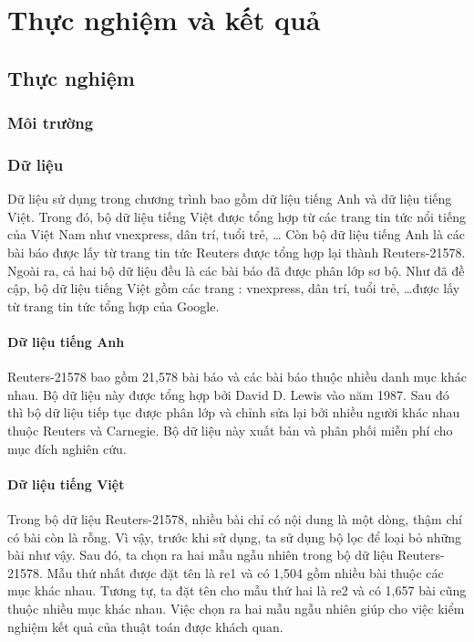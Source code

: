 \chapter{Thực nghiệm và kết quả}
\label{Chapter4}
\section{Thực nghiệm}
\subsection{Môi trường}


\subsection{Dữ liệu}
Dữ liệu sử dụng trong chương trình bao gồm dữ liệu tiếng Anh và dữ liệu tiếng Việt.
Trong đó, bộ dữ liệu tiếng Việt được tổng hợp từ các trang tin tức nổi tiếng của Việt Nam như vnexpress, dân trí, tuổi trẻ, \ldots
Còn bộ dữ liệu tiếng Anh là các bài báo được lấy từ trang tin tức Reuters được tổng hợp lại thành Reuters-21578.
Ngoài ra, cả hai bộ dữ liệu đều là các bài báo đã được phân lớp sơ bộ.
Như đã đề cập, bộ dữ liệu tiếng Việt gồm các trang : vnexpress, dân trí, tuổi trẻ, \ldots được lấy từ trang tin tức tổng hợp của Google.

\subsubsection{Dữ liệu tiếng Anh}
Reuters-21578 bao gồm 21,578 bài báo và các bài báo thuộc nhiều danh mục khác nhau.
Bộ dữ liệu này được tổng hợp bởi David D. Lewis vào năm 1987.
Sau đó thì bộ dữ liệu tiếp tục được phân lớp và chỉnh sửa lại bởi nhiều người khác nhau thuộc Reuters và Carnegie.
Bộ dữ liệu này xuất bản và phân phối miễn phí cho mục đích nghiên cứu.

\subsubsection{Dữ liệu tiếng Việt}
Trong bộ dữ liệu Reuters-21578, nhiều bài chỉ có nội dung là một dòng, thậm chí có bài còn là rỗng.
Vì vậy, trước khi sử dụng, ta sử dụng bộ lọc để loại bỏ những bài như vậy.
Sau đó, ta chọn ra hai mẫu ngẫu nhiên trong bộ dữ liệu Reuters-21578.
Mẫu thứ nhất được đặt tên là re1 và có 1,504 gồm nhiều bài thuộc các mục khác nhau.
Tương tự, ta đặt tên cho mẫu thứ hai là re2 và có 1,657 bài cũng thuộc nhiều mục khác nhau.
Việc chọn ra hai mẫu ngẫu nhiên giúp cho việc kiểm nghiệm kết quả của thuật toán được khách quan.

